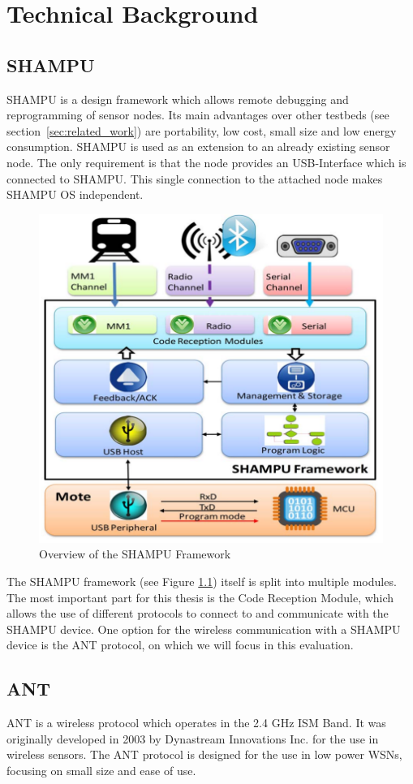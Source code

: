 \chapter{Technical Background}
\section{SHAMPU}
SHAMPU\cite{smeets2014demonstration} is a design framework which allows remote debugging and reprogramming of sensor nodes. Its main advantages over other testbeds (see section~\ref{sec:related_work}) are portability, low cost, small size and low energy consumption. SHAMPU is used as an extension to an already existing sensor node. The only requirement is that the node provides an USB-Interface which is connected to SHAMPU. This single connection to the attached node makes SHAMPU OS independent.
\begin{figure}[H]
	\centering
	\includegraphics[scale=.5]{content/images/SHAMPUframework.png}
	\caption{Overview of the SHAMPU Framework \cite{smeets2014demonstration}}\label{fig:shampuframework}
\end{figure}
The SHAMPU framework (see Figure \ref{fig:shampuframework}) itself is split into multiple modules. The most important part for this thesis is the Code Reception Module, which allows the use of different protocols to connect to and communicate with the SHAMPU device. One option for the wireless communication with a SHAMPU device is the ANT protocol, on which we will focus in this evaluation.

\section{ANT}
ANT \cite{DynastreamInnovationsInc.2013} is a wireless protocol which operates in the 2.4 GHz ISM Band. It was originally developed in 2003 by Dynastream Innovations Inc. for the use in wireless sensors. The ANT protocol is designed for the use in low power WSNs, focusing on small size and ease of use.

